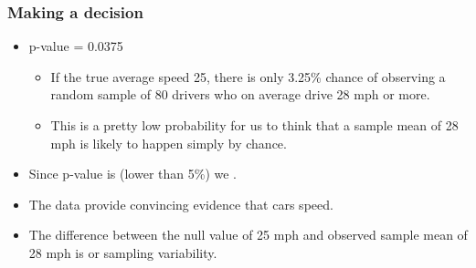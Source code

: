 
\begin{frame}
\frametitle{Making a decision}

\begin{itemize}

\item p-value = 0.0375

\pause

\begin{itemize}
\item If the true average speed 25, there is only 3.25\% chance of observing a random sample of 80 drivers who on average drive 28 mph or more.
\pause
\item This is a pretty low probability for us to think that a sample mean of 28 mph is likely to happen simply by chance.
\end{itemize}

\pause
\item Since p-value is  (lower than 5\%) we .

\pause
\item The data provide convincing evidence that cars speed.

\pause
\item The difference between the null value of 25 mph and observed sample mean of 28 mph is  or sampling variability.

\end{itemize}

\end{frame}


